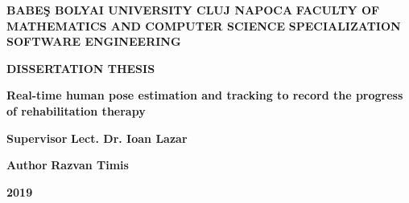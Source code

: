 
\begin{titlepage}
\sloppy
\begin{center}
\fontsize{16}{18} \textbf{BABE\c S BOLYAI UNIVERSITY CLUJ NAPOCA}
\break \break 
\fontsize{16}{18} \textbf{FACULTY OF MATHEMATICS AND COMPUTER SCIENCE}
\break \break 
\fontsize{16}{18} \textbf{SPECIALIZATION SOFTWARE ENGINEERING}

\vspace{5cm}

\fontsize{18}{18} \textbf{DISSERTATION THESIS}

\vspace{1cm}

\fontsize{22}{18} \textbf{Real-time human pose estimation and tracking to record the progress of rehabilitation therapy}

\end{center}

\vspace{5cm}

\begin{flushleft}
\fontsize{16}{18} \textbf{Supervisor} \break
\Large{\textbf{Lect. Dr. Ioan Lazar}}
\end{flushleft}

\begin{flushright}
\fontsize{16}{18} \textbf{Author} \break
\Large{\textbf{Razvan Timis}}
\end{flushright}

\vspace{3cm}

\begin{center}
\fontsize{16}{18} \textbf{2019}
\end{center}

\end{titlepage}